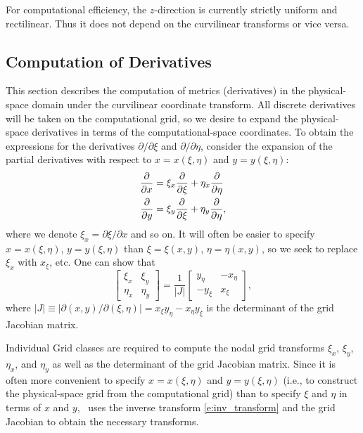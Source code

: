 \documentclass[letterpaper,10pt]{article}
\begin{document}
For computational efficiency, the $z$-direction is currently strictly uniform and rectilinear. Thus it does not depend on the curvilinear transforms or vice versa. 


\subsection{Computation of Derivatives} \label{sec:transforms}

This section describes the computation of metrics (derivatives) in the physical-space domain under the curvilinear coordinate transform. All discrete derivatives will be taken on the computational grid, so we desire to expand the physical-space derivatives in terms of the computational-space coordinates. To obtain the expressions for the derivatives $\partial/\partial\xi$ and $\partial/\partial\eta$, consider the expansion of the partial derivatives with respect to $x=x(\xi,\eta)$ and $y=y(\xi,\eta)$:
\begin{align*}
  \frac{\partial }{\partial x} &= \xi_x\frac{\partial }{\partial \xi} + \eta_x\frac{\partial }{\partial \eta} \\
  \frac{\partial }{\partial y} &= \xi_y\frac{\partial }{\partial \xi} + \eta_y\frac{\partial }{\partial \eta},
\end{align*}
where we denote $\xi_x=\partial\xi/\partial x$ and so on. It will often be easier to specify $x=x(\xi,\eta)$, $y=y(\xi,\eta)$ than $\xi=\xi(x,y)$, $\eta=\eta(x,y)$, so we seek to replace $\xi_x$ with $x_\xi$, etc. One can show that
\begin{equation}
  \left[ \begin{array}{cc} \xi_x & \xi_y \\
      \eta_x & \eta_y \end{array} \right] =
  \frac{1}{|J|}  \left[ \begin{array}{cc} y_\eta & -x_\eta \\
      -y_\xi & x_\xi \end{array} \right],
  \label{e:inv_transform}
\end{equation}
where $|J|\equiv |\partial(x,y)/\partial(\xi,\eta)| = x_\xi y_\eta - x_\eta y_\xi$ is the determinant of the grid Jacobian matrix. 

Individual Grid classes are required to compute the nodal grid transforms $\xi_x$, $\xi_y$, $\eta_x$, and $\eta_y$ as well as the determinant of the grid Jacobian matrix. Since it is often more convenient to specify $x=x(\xi,\eta)$ and $y=y(\xi,\eta)$ (i.e., to construct the physical-space grid from the computational grid) than to specify $\xi$ and $\eta$ in terms of $x$ and $y$, \code\ uses the inverse transform \eqref{e:inv_transform} and the grid Jacobian to obtain the necessary transforms.
\end{document}
